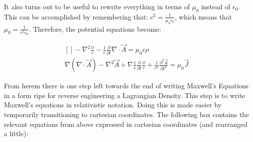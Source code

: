 \documentclass[a4]{article}
\begin{document}
    It also turns out to be useful to rewrite everything in terms of $\mu_0$ instead of $\epsilon_0$. This can be accomplished by remembering that: $c^2 = \frac{1}{\mu_0 \epsilon_0}$, which means that
    $\mu_0 = \frac{1}{c^2 \epsilon_0}$. Therefore, the potential equations become: 

    \begin{framed}
        \begin{equation}
            \begin{aligned}[]
                - \nabla^2 \frac{\phi}{c} - \frac{1}{c} \frac{\partial}{\partial t} \nabla \cdot \vec{A} = \mu_0 c \rho \\
                \nabla (\nabla \cdot \vec{A})  - \nabla^2 \vec{A} + \nabla \frac{1}{c} \frac{\partial}{\partial t} \frac{\phi}{c} + \frac{1}{c^2} \frac{\partial^2 \vec{A}}{\partial t^2} = \mu_0 \vec{J}
            \end{aligned}
        \end{equation}
    \end{framed}

    From herem there is one step left towards the end of writing Maxwell's Equations in a form ripe for reverse engineering a Lagrangian Density. This step is to write Maxwell's equations in relativistic notation. Doing this is made easier by temporarily
    transitioning to cartesian coordinates. The following box contains the relevant equations from above expressed in cartesian coordinates (and rearranged a little):
\end{document}
